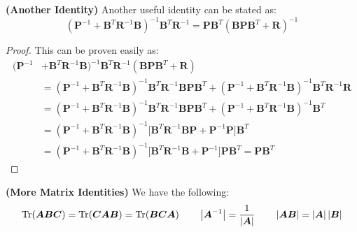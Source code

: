 \begin{proposition}{\textbf{(Another Identity)}}
    Another useful identity can be stated as:
    \begin{equation*}
        (\boldsymbol P^{-1} + \boldsymbol B^T\boldsymbol R^{-1}\boldsymbol B)^{-1}\boldsymbol B^T\boldsymbol R^{-1} = \boldsymbol P\boldsymbol B^T(\boldsymbol B\boldsymbol P\boldsymbol B^T + \boldsymbol R)^{-1}
    \end{equation*}
\end{proposition}
\begin{proof}
    This can be proven easily as:
    \begin{equation*}
    \begin{aligned}
        (\boldsymbol P^{-1} &+ \boldsymbol B^T\boldsymbol R^{-1}\boldsymbol B)^{-1}\boldsymbol B^T\boldsymbol R^{-1} (\boldsymbol B\boldsymbol P\boldsymbol B^T + \boldsymbol R) \\
        &= (\boldsymbol P^{-1} + \boldsymbol B^T\boldsymbol R^{-1}\boldsymbol B)^{-1}\boldsymbol B^T\boldsymbol R^{-1}\boldsymbol B\boldsymbol P\boldsymbol B^T +  (\boldsymbol P^{-1} + \boldsymbol B^T\boldsymbol R^{-1}\boldsymbol B)^{-1}\boldsymbol B^T\boldsymbol R^{-1}\boldsymbol R \\
        &= (\boldsymbol P^{-1} + \boldsymbol B^T\boldsymbol R^{-1}\boldsymbol B)^{-1}\boldsymbol B^T\boldsymbol R^{-1}\boldsymbol B\boldsymbol P\boldsymbol B^T +  (\boldsymbol P^{-1} + \boldsymbol B^T\boldsymbol R^{-1}\boldsymbol B)^{-1}\boldsymbol B^T \\
        &= (\boldsymbol P^{-1} + \boldsymbol B^T\boldsymbol R^{-1}\boldsymbol B)^{-1}\Big[\boldsymbol B^T\boldsymbol R^{-1}\boldsymbol B\boldsymbol P + \boldsymbol P^{-1}\boldsymbol P\Big]\boldsymbol B^T \\
        &= (\boldsymbol P^{-1} + \boldsymbol B^T\boldsymbol R^{-1}\boldsymbol B)^{-1}\Big[\boldsymbol B^T\boldsymbol R^{-1}\boldsymbol B + \boldsymbol P^{-1}\Big]\boldsymbol P\boldsymbol B^T = \boldsymbol P \boldsymbol B^T
    \end{aligned}
    \end{equation*}
\end{proof}

\begin{remark}{\textbf{(More Matrix Identities)}}
    We have the following:
    \begin{equation*}
    \begin{aligned}
        \operatorname{Tr}(\boldsymbol A\boldsymbol B\boldsymbol C) = \operatorname{Tr}(\boldsymbol C\boldsymbol A\boldsymbol B) = \operatorname{Tr}(\boldsymbol B\boldsymbol C\boldsymbol A) 
        \qquad \left| \boldsymbol A^{-1} \right| = \frac{1}{\left| \boldsymbol A \right|}
        \qquad \left| \boldsymbol A \boldsymbol B \right| = \left| \boldsymbol A \right|\left| \boldsymbol B \right|
    \end{aligned}
    \end{equation*}
\end{remark}

